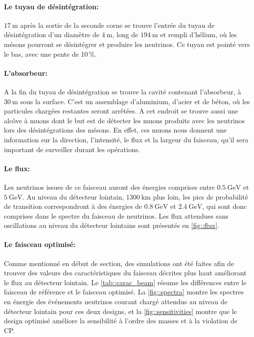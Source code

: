       \paragraph{Le tuyau de désintégration:} $\SI{17}{\meter}$ après la sortie de la seconde corne se trouve l'entrée du tuyau de désintégration d'un diamètre de $\SI{4}{\meter}$, long de $\SI{194}{\meter}$ et rempli d'hélium, où les mésons pourront se désintégrer et produire les neutrinos. Ce tuyau est pointé vers le bas, avec une pente de 10\,\%.
        
      \paragraph{L'absorbeur:} A la fin du tuyau de désintégration se trouve la cavité contenant l'absorbeur, à $\SI{30}{\meter}$ sous la surface. C'est un assemblage d'aluminium, d'acier et de béton, où les particules chargées restantes seront arrêtées. A cet endroit se trouve aussi une alcôve à muons dont le but est de détecter les muons produits avec les neutrinos lors des désintégrations des mésons. En effet, ces muons nous donnent une information sur la direction, l'intensité, le flux et la largeur du faisceau, qu'il sera important de surveiller durant les opérations.
        
      \paragraph{Le flux:} Les neutrinos issues de ce faisceau auront des énergies comprises entre $\SI{0.5}{\giga\electronvolt}$ et $\SI{5}{\giga\electronvolt}$. Au niveau du détecteur lointain, $\SI{1300}{\kilo\meter}$ plus loin, les pics de probabilité de transition correspondront à des énergies de $\SI{0.8}{\giga\electronvolt}$ et $\SI{2.4}{\giga\electronvolt}$, qui sont donc comprises dans le spectre du faisceau de neutrinos. Les flux attendues sans oscillations au niveau du détecteur lointains sont présentés en \autoref{fig::flux}.

      \paragraph{Le faisceau optimisé:} Comme mentionné en début de section, des simulations ont été faites afin de trouver des valeurs des caractéristiques du faisceau décrites plus haut améliorant le flux au détecteur lointain. Le \autoref{tab::carac_beam} résume les différences entre le faisceau de référence et le faisceau optimisé. La \autoref{fig::spectra} montre les spectres en énergie des événements neutrinos courant chargé attendus au niveau de détecteur lointain pour ces deux designs, et la \autoref{fig::sensitivities} montre que le design optimisé améliore la sensibilité à l'ordre des masses et à la violation de CP.
        
